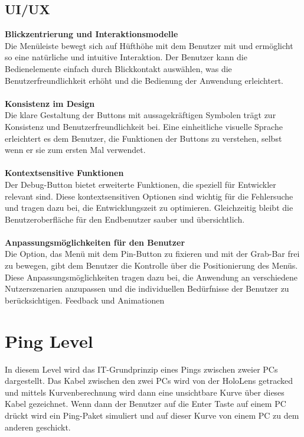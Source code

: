 \subsection{UI/UX}
\textbf{Blickzentrierung und Interaktionsmodelle}\\
Die Menüleiste bewegt sich auf Hüfthöhe mit dem Benutzer mit und ermöglicht so eine natürliche und intuitive Interaktion.
Der Benutzer kann die Bedienelemente einfach durch Blickkontakt auswählen, was die Benutzerfreundlichkeit erhöht und die
Bedienung der Anwendung erleichtert.\\
\\
\textbf{Konsistenz im Design}\\
Die klare Gestaltung der Buttons mit aussagekräftigen Symbolen trägt zur Konsistenz und Benutzerfreundlichkeit bei.
Eine einheitliche visuelle Sprache erleichtert es dem Benutzer, die Funktionen der Buttons zu verstehen, selbst wenn er
sie zum ersten Mal verwendet.\\
\\
\textbf{Kontextsensitive Funktionen}\\
Der Debug-Button bietet erweiterte Funktionen, die speziell für Entwickler relevant sind. Diese kontextsensitiven
Optionen sind wichtig für die Fehlersuche und tragen dazu bei, die Entwicklungszeit zu optimieren. Gleichzeitig bleibt
die Benutzeroberfläche für den Endbenutzer sauber und übersichtlich.\\
\\
\textbf{Anpassungsmöglichkeiten für den Benutzer}\\
Die Option, das Menü mit dem Pin-Button zu fixieren und mit der Grab-Bar frei zu bewegen, gibt dem Benutzer die
Kontrolle über die Positionierung des Menüs. Diese Anpassungsmöglichkeiten tragen dazu bei, die Anwendung an
verschiedene Nutzerszenarien anzupassen und die individuellen Bedürfnisse der Benutzer zu berücksichtigen.
Feedback und Animationen

\section{Ping Level}
In diesem Level wird das IT-Grundprinzip eines Pings zwischen zweier
PCs dargestellt. Das Kabel zwischen den zwei PCs wird von der
HoloLens getracked und mittels Kurvenberechnung wird dann eine
unsichtbare Kurve über dieses Kabel gezeichnet. Wenn dann der Benutzer
auf die Enter Taste auf einem PC drückt wird ein Ping-Paket simuliert
und auf dieser Kurve von einem PC zu dem anderen geschickt.

